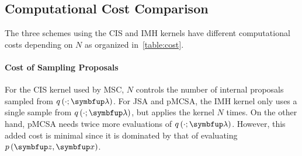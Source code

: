 
\begin{wraptable}{r}{0.5\textwidth}
  \centering
  \vspace{-0.45in}
  
  \vspace{-0.2in}
\end{wraptable}
%
\vspace{-0.05in}
\subsection{Computational Cost Comparison}
\vspace{-0.05in}
The three schemes using the CIS and IMH kernels have different computational costs depending on \(N\) as organized in~\cref{table:cost}.

\vspace{-0.1in}
\paragraph{Cost of Sampling Proposals}
For the CIS kernel used by MSC, \(N\) controls the number of internal proposals sampled from \(q\,(\cdot; \vlambda)\).
For JSA and pMCSA, the IMH kernel only uses a single sample from \(q\,(\cdot; \vlambda)\), but applies the kernel \(N\) times.
On the other hand, pMCSA needs twice more evaluations of \(q\,(\cdot; \vlambda)\).
However, this added cost is minimal since it is dominated by that of evaluating \(p\,(\vz,\vx)\).

